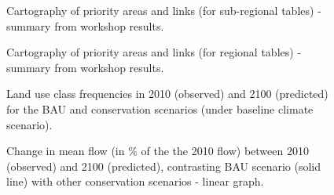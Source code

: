 {%

\begin{figure}[h!]
\caption{Cartography of priority areas and links (for sub-regional tables) - summary from workshop results.}
\label{fig:reg}
\end{figure}
\clearpage

\begin{figure}[h!]
\caption{Cartography of priority areas and links (for regional tables) - summary from workshop results.}
\label{fig:trans}
\end{figure}
\clearpage


\begin{figure}[h!]
\caption{Land use class frequencies in 2010 (observed) and 2100 (predicted) for the BAU and conservation scenarios (under baseline climate scenario).}
\label{fig:bar_chap2}
\end{figure}


\begin{figure}[h!]
 \caption{Change in mean flow (in \% of the the 2010 flow) between 2010 (observed) and 2100 (predicted), contrasting BAU scenario (solid line) with other conservation scenarios - linear graph.}
 \label{fig:flow_linear_2}
\end{figure}

}
